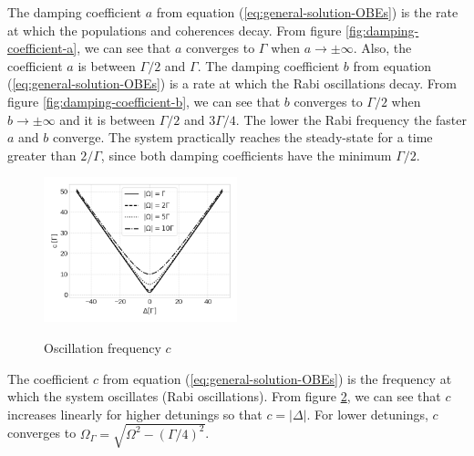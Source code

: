 {\begin{figure}[H]
	\label{fig:damping-coefficients}
	\vspace{-30pt}
\end{figure}
The damping coefficient $ a $ from equation (\ref{eq:general-solution-OBEs}) is the rate at which the populations and coherences decay. From figure \ref{fig:damping-coefficient-a}, we can see that $ a $ converges to $ \Gamma $ when $ a \rightarrow \pm \infty $. Also, the coefficient $ a $ is between $ \Gamma/2 $ and $ \Gamma $. The damping coefficient $ b $ from equation (\ref{eq:general-solution-OBEs}) is a rate at which the Rabi oscillations decay. From figure \ref{fig:damping-coefficient-b}, we can see that $ b $ converges to $ \Gamma / 2 $ when $ b \rightarrow \pm \infty $ and it is between $ \Gamma / 2 $ and $ 3\Gamma/4 $. The lower the Rabi frequency the faster $ a $ and $ b $ converge. The system practically reaches the steady-state for a time greater than $ 2 / \Gamma $, since both damping coefficients have the minimum $ \Gamma / 2 $.

\begin{figure}[!ht]
	\centering
	\caption{Oscillation frequency $ c $}
	\vspace{-10pt}
	\includegraphics[width=0.5\textwidth]{USPSC-img/oscillation_frequency_c.png}
	\label{fig:oscillation-frequency-c}
	\vspace{-15pt}
\end{figure}

The coefficient $ c $ from equation (\ref{eq:general-solution-OBEs}) is the frequency at which the system oscillates (Rabi oscillations). From figure \ref{fig:oscillation-frequency-c}, we can see that $ c $ increases linearly for higher detunings so that $ c = |\Delta| $. For lower detunings, $ c $ converges to $ \Omega_{\Gamma} = \sqrt{\Omega^2 - (\Gamma/4)^2} $.

}
